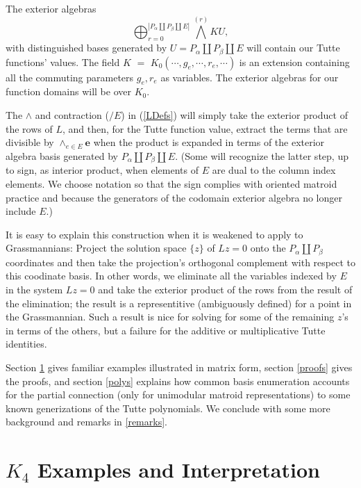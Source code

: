 \documentclass[Unicode]{cedram-alco}
\newcommand{\ext}[1]{\ensuremath{\mathbf{#1}}}
\newcommand{\dunion}{\coprod}
\begin{document}
The exterior algebras
\[
\bigoplus_{r=0}^{\left|P_\alpha \dunion P_\beta \dunion E\right|} {\bigwedge}^{(r)} KU,
\]
with distinguished bases generated by $U=P_\alpha \dunion P_\beta \dunion E$
will contain our Tutte functions' values.
The 
field $K$ $=$ $K_0( \cdots, g_e , \cdots , r_e , \cdots )$
is an extension containing 
all the commuting parameters $g_e, r_e$ as variables. The
exterior algebras for our function domains will be over $K_0$.

The $\wedge$ and contraction ($/E$) in (\ref{LDefs})
will simply take the exterior product of the rows of $L$, and
then, for the Tutte function value,
extract the terms that are divisible by $\wedge_{e \in E}\ext{e}$
when the product
is expanded in terms of the exterior algebra basis
generated by $P_\alpha \dunion P_\beta \dunion E$.
(Some will recognize the latter step, up to sign, as interior product,
when elements
of $E$ are dual to the column index elements.  We choose notation
so that the sign complies with oriented matroid practice\cite{OMBOOK} and
because the generators of the codomain exterior algebra no longer include $E$.)



It is easy to explain this construction when it is weakened
to apply to Grassmannians:
Project the solution space $\{z\}$ of $Lz=0$ onto
the $P_\alpha\dunion P_\beta$ coordinates and then take the projection's orthogonal
complement with respect to this coodinate  basis.
In other words, we eliminate all the variables
indexed by $E$ in the system $Lz=0$ and take the exterior product of the rows
from the result of the elimination; the result is a 
representitive (ambiguously defined) for a point in the Grassmannian.
Such a result is nice for solving for some of the remaining $z$'s in terms of
the others, but a failure
for the additive or multiplicative Tutte identities.

Section \ref{examples} gives familiar examples illustrated in matrix form,
section \ref{proofs} gives the proofs, and section \ref{polys} explains
how common basis enumeration accounts for the partial connection
(only for unimodular matroid representations) to some known generizations
of the Tutte polynomials.  We conclude with some more background and remarks
in \ref{remarks}.


\section{$K_4$ Examples and Interpretation}\label{examples}
\end{document}
